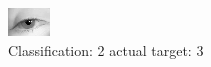 \begin{figure}[h!]
\begin{center}
\includegraphics[width=0.60\columnwidth]{figures/ID2867_class_2_target_3.png}
\end{center}
\caption{ Classification: 2 actual target: 3}
\label{fig:ID2867_class_2_target_3}
\end{figure}

